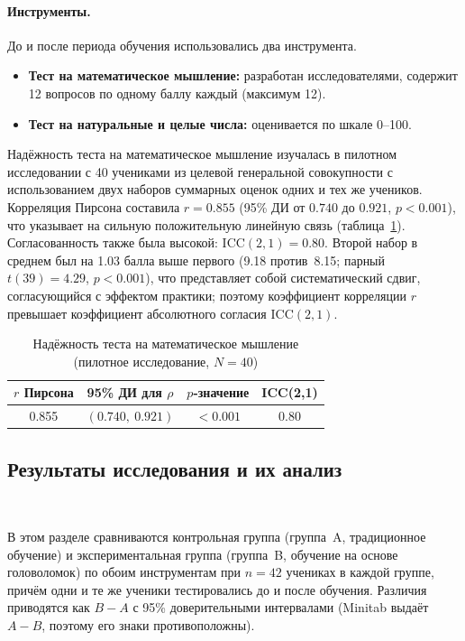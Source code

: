 \documentclass[a4paper,14pt]{extreport}
\theoremstyle{plain}
\theoremstyle{definition}
\theoremstyle{remark}
\begin{document}
\paragraph{Инструменты.}
До и после периода обучения использовались два инструмента.
\begin{itemize}
	\item \textbf{Тест на математическое мышление:} разработан исследователями, содержит 12 вопросов по одному баллу каждый (максимум 12).
	\item \textbf{Тест на натуральные и целые числа:} оценивается по шкале 0--100. 
\end{itemize}
Надёжность теста на математическое мышление изучалась в пилотном исследовании с 40 учениками из целевой генеральной совокупности с использованием двух наборов суммарных оценок одних и тех же учеников. 
Корреляция Пирсона составила $r = 0.855$ (95\% ДИ от $0.740$ до $0.921$, $p < 0.001$), что указывает на сильную положительную линейную связь (таблица~\ref{table:pearson}). Согласованность также была высокой: $\mathrm{ICC}(2,1)=0.80$. Второй набор в среднем был на 1.03 балла выше первого (9.18 против\ 8.15; парный $t(39)=4.29$, $p<0.001$), что представляет собой систематический сдвиг, согласующийся с эффектом практики; поэтому коэффициент корреляции $r$ превышает коэффициент абсолютного согласия $\mathrm{ICC}(2,1)$.

\begin{table}[ht!]
	\centering
	\caption{Надёжность теста на математическое мышление (пилотное исследование, $N=40$)}
	\label{table:pearson}
	\begin{tabular}{|c|c|c|c|}
		\hline
		\textbf{$r$ Пирсона} & \textbf{95\% ДИ для $\rho$} & \textbf{$p$-значение} & \textbf{ICC(2,1)} \\ \hline
		0.855 & $(0.740,\ 0.921)$ & $< 0.001$ & 0.80 \\ \hline
	\end{tabular}
\end{table}
\subsection{Результаты исследования и их анализ}~\label{sec4.3.6}

В этом разделе сравниваются контрольная группа (группа~A, традиционное обучение) и экспериментальная группа (группа~B, обучение на основе головоломок) по обоим инструментам при $n=42$ учениках в каждой группе, причём одни и те же ученики тестировались до и после обучения. Различия приводятся как $B-A$ с 95\% доверительными интервалами (Minitab выдаёт $A-B$, поэтому его знаки противоположны).
\end{document}
